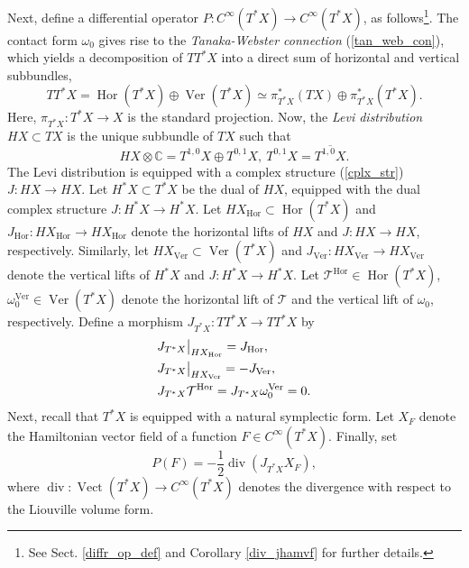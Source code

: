 \documentclass{article}
\newcommand{\CC}{\mathbb C}
\newcommand{\mct}{\mathcal T}
\DeclareMathOperator{\Div}{div}
\DeclareMathOperator{\Vect}{Vect}
\DeclareMathOperator{\Hor}{Hor}
\DeclareMathOperator{\Ver}{Ver}
\begin{document}
Next, define a differential operator $P : C^\infty(T^*X) \to C^\infty(T^*X)$, as follows\footnote{See Sect. \ref{diffr_op_def} and Corollary \ref{div_jhamvf} for further details.}. The contact form $\omega_0$ gives rise to the \textit{Tanaka-Webster connection} (\ref{tan_web_con}), which yields a decomposition of $T T^*X$ into a direct sum of horizontal and vertical subbundles, $$T T^*X = \Hor(T^*X) \oplus \Ver(T^*X) \simeq \pi^*_{T^*X}(TX) \oplus \pi^*_{T^*X}(T^*X).$$ Here, $\pi_{T^*X} : T^*X \to X$ is the standard projection.
%
Now, the \textit{Levi distribution} $HX \subset TX$ is the unique subbundle of $TX$ such that \begin{equation}\label{levi_distribution}HX \otimes \CC = T^{1,0}X \oplus T^{0,1}X,\ T^{0,1}X = \overline{T^{1,0}X}.\end{equation} The Levi distribution is equipped with a complex structure (\ref{cplx_str}) $J : HX \to HX$. Let $H^*X \subset T^*X$ be the dual of $HX$, equipped with the dual complex structure $J : H^*X \to H^*X$. Let $H X_{\Hor} \subset \Hor(T^*X)$ and $J_{\Hor} : H X_{\Hor} \to H X_{\Hor}$ denote the horizontal lifts of $HX$ and $J:HX \to HX$, respectively. Similarly, let $H X_{\Ver} \subset \Ver(T^*X)$ and $J_{\Ver} : HX_{\Ver} \to HX_{\Ver}$ denote the vertical lifts of $H^*X$ and $J : H^*X \to H^*X$. Let $\mct^{\Hor} \in \Hor(T^*X)$, $\omega_0^{\Ver} \in \Ver(T^*X)$ denote the horizontal lift of $\mct$ and the vertical lift of $\omega_0$, respectively. Define a morphism $J_{T^*X} : T T^*X \to T T^*X$ by \begin{equation*}\begin{aligned} &J_{T^*X} \big{|}_{HX_{\Hor}} = J_{\Hor},\\ &J_{T^*X} \big{|}_{HX_{\Ver}} = - J_{\Ver},\\ &J_{T^*X} \mct^{\Hor} = J_{T^*X} \omega_0^{\Ver} = 0. \end{aligned}\end{equation*}
%
%
Next, recall that $T^*X$ is equipped with a natural symplectic form.
Let $X_F$ denote the Hamiltonian vector field of a function $F \in C^\infty(T^*X)$. Finally, set $$P(F) = -\frac 1 2\Div(J_{T^*X} X_F),$$
where $\Div : \Vect(T^*X) \to C^\infty(T^*X)$ denotes the divergence with respect to the Liouville volume form.
%
%
\end{document}
